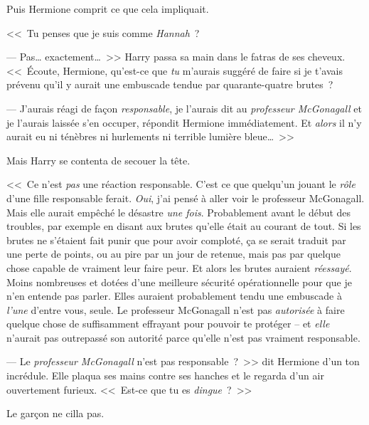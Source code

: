 Puis Hermione comprit ce que cela impliquait.

<<~Tu penses que je suis comme \emph{Hannah}~?

--- Pas… exactement…~>> Harry passa sa main dans le fatras de ses cheveux. <<~Écoute, Hermione, qu'est-ce que \emph{tu} m'aurais suggéré de faire si je t'avais prévenu qu'il y aurait une embuscade tendue par quarante-quatre brutes~?

--- J'aurais réagi de façon \emph{responsable}, je l'aurais dit au \emph{professeur McGonagall} et je l'aurais laissée s'en occuper, répondit Hermione immédiatement. Et \emph{alors} il n'y aurait eu ni ténèbres ni hurlements ni terrible lumière bleue…~>>

Mais Harry se contenta de secouer la tête.

<<~Ce n'est \emph{pas} une réaction responsable. C'est ce que quelqu'un jouant le \emph{rôle} d'une fille responsable ferait. \emph{Oui}, j'ai pensé à aller voir le professeur McGonagall. Mais elle aurait empêché le désastre \emph{une fois}. Probablement avant le début des troubles, par exemple en disant aux brutes qu'elle était au courant de tout. Si les brutes ne s'étaient fait punir que pour avoir comploté, ça se serait traduit par une perte de points, ou au pire par un jour de retenue, mais pas par quelque chose capable de vraiment leur faire peur. Et alors les brutes auraient \emph{réessayé}. Moins nombreuses et dotées d'une meilleure sécurité opérationnelle pour que je n'en entende pas parler. Elles auraient probablement tendu une embuscade à \emph{l'une} d'entre vous, seule. Le professeur McGonagall n'est pas \emph{autorisée} à faire quelque chose de suffisamment effrayant pour pouvoir te protéger -- et \emph{elle} n'aurait pas outrepassé son autorité parce qu'elle n'est pas vraiment responsable.

--- Le \emph{professeur McGonagall} n'est pas responsable~?~>> dit Hermione d'un ton incrédule. Elle plaqua ses mains contre ses hanches et le regarda d'un air ouvertement furieux. <<~Est-ce que tu es \emph{dingue}~?~>>

Le garçon ne cilla pas.

